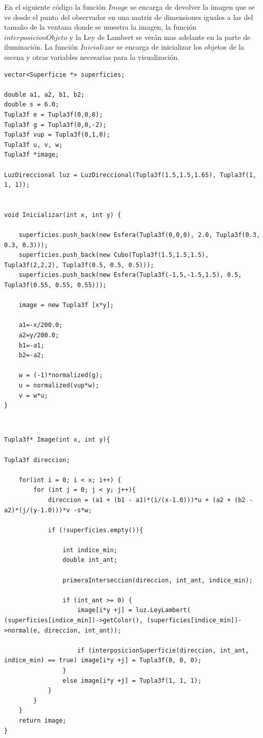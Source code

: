 En el siguiente código la función $Image$ se encarga de devolver la imagen que se ve desde el punto del observador en una matriz de dimensiones iguales a las del tamaño de la ventana donde se muestra la imagen, la función $interposicionObjeto$ y la Ley de Lambert se verán mas adelante en la parte de iluminación. La función $Inicializar$ se encarga de inicializar los objetos de la escena y otras variables necesarias para la visualización.
${ }$\\

\begin{lstlisting}[style=Consola]
vector<Superficie *> superficies;

double a1, a2, b1, b2;
double s = 6.0;
Tupla3f e = Tupla3f(0,0,8);
Tupla3f g = Tupla3f(0,0,-2);
Tupla3f vup = Tupla3f(0,1,0);
Tupla3f u, v, w;
Tupla3f *image;

LuzDireccional luz = LuzDireccional(Tupla3f(1.5,1.5,1.65), Tupla3f(1, 1, 1));


void Inicializar(int x, int y) {

	superficies.push_back(new Esfera(Tupla3f(0,0,0), 2.0, Tupla3f(0.3, 0.3, 0.3)));
	superficies.push_back(new Cubo(Tupla3f(1.5,1.5,1.5), Tupla3f(2,2,2), Tupla3f(0.5, 0.5, 0.5)));
	superficies.push_back(new Esfera(Tupla3f(-1.5,-1.5,1.5), 0.5, Tupla3f(0.55, 0.55, 0.55)));
	
	image = new Tupla3f [x*y];

	a1=-x/200.0;
	a2=y/200.0;
	b1=-a1;
	b2=-a2;

	w = (-1)*normalized(g);
	u = normalized(vup*w);
	v = w*u;
}

\end{lstlisting}
${ }$\\


\begin{lstlisting}[style=Consola]
Tupla3f* Image(int x, int y){

Tupla3f direccion;

	for(int i = 0; i < x; i++) {
		for (int j = 0; j < y; j++){
			direccion = (a1 + (b1 - a1)*(i/(x-1.0)))*u + (a2 + (b2 - a2)*(j/(y-1.0)))*v -s*w;

			if (!superficies.empty()){

				int indice_min;
				double int_ant;

				primeraInterseccion(direccion, int_ant, indice_min);

				if (int_ant >= 0) {
					image[i*y +j] = luz.LeyLambert( (superficies[indice_min])->getColor(), (superficies[indice_min])->normal(e, direccion, int_ant));

					if (interposicionSuperficie(direccion, int_ant, indice_min) == true) image[i*y +j] = Tupla3f(0, 0, 0);
				}
				else image[i*y +j] = Tupla3f(1, 1, 1);
			}
		}
	}
	return image;
}


\end{lstlisting}
${ }$\\

